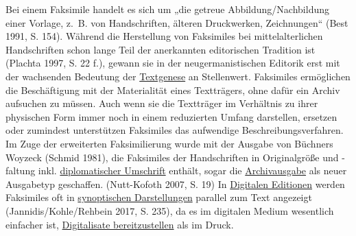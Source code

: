 \documentclass{article}
\begin{document}
    Bei einem Faksimile handelt es sich um „die getreue Abbildung/Nachbildung einer
                  Vorlage, z. B. von Handschriften, älteren Druckwerken, Zeichnungen“ (Best
                     1991, S. 154). Während die Herstellung von Faksimiles bei
                  mittelalterlichen Handschriften schon lange Teil der anerkannten editorischen
                  Tradition ist (Plachta 1997, S. 22 f.), gewann sie in der
                  neugermanistischen Editorik erst mit der wachsenden Bedeutung der \href{http://gams.uni-graz.at/o:konde.28}{Textgenese} an Stellenwert.
                  Faksimiles ermöglichen die Beschäftigung mit der Materialität eines Textträgers,
                  ohne dafür ein Archiv aufsuchen zu müssen. Auch wenn sie die Textträger im
                  Verhältnis zu ihrer physischen Form immer noch in einem reduzierten Umfang
                  darstellen, ersetzen oder zumindest unterstützen Faksimiles das aufwendige
                  Beschreibungsverfahren. Im Zuge der erweiterten Faksimilierung wurde mit der
                  Ausgabe von Büchners Woyzeck (Schmid 1981), die Faksimiles der Handschriften
                  in Originalgröße und -faltung inkl. \href{http://gams.uni-graz.at/o:konde.66}{diplomatischer Umschrift} enthält, sogar die \href{http://gams.uni-graz.at/o:konde.33}{Archivausgabe} als neuer Ausgabetyp geschaffen.
                     (Nutt-Kofoth 2007, S. 19) In \href{http://gams.uni-graz.at/o:konde.59}{Digitalen Editionen} werden Faksimiles oft in \href{http://gams.uni-graz.at/o:konde.174}{synoptischen Darstellungen} parallel
                  zum Text angezeigt (Jannidis/Kohle/Rehbein 2017, S. 235), da es im
                  digitalen Medium wesentlich einfacher ist, \href{http://gams.uni-graz.at/o:konde.36}{Digitalisate bereitzustellen} als im Druck.\\
            
\end{document}
